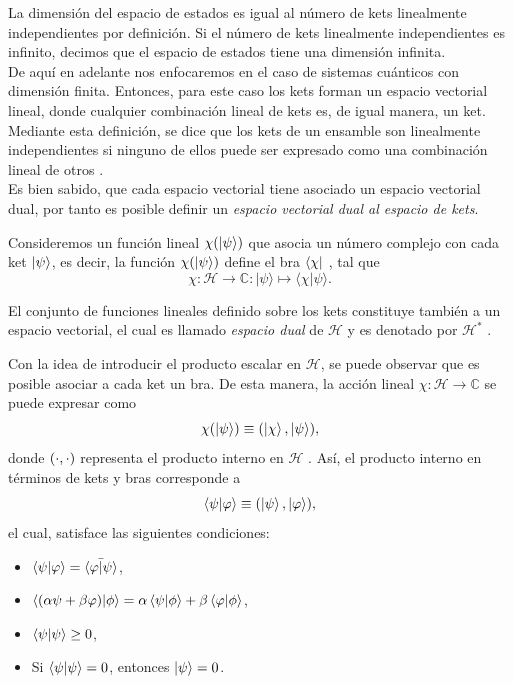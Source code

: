 \documentclass[../Main.tex]{subfiles}
\begin{document}
La dimensión del espacio de estados es igual al número de kets linealmente independientes por definición. Si el número de kets linealmente independientes es infinito, decimos que el espacio de estados tiene una dimensión infinita.\\
De aquí en adelante nos enfocaremos en el caso de sistemas cuánticos con dimensión finita. Entonces, para este caso los kets forman un espacio vectorial lineal, donde cualquier combinación lineal de kets es, de igual manera, un ket. 
Mediante esta definición, se dice que los kets de un ensamble son linealmente independientes si ninguno de ellos puede ser expresado como una combinación lineal de otros \cite{Messiah}.\\


Es bien sabido, que cada espacio vectorial tiene asociado un espacio vectorial dual, por tanto es posible definir un \emph{espacio vectorial dual al espacio de kets}.


Consideremos un función lineal $\chi(\ket{\psi})$ que asocia un número complejo con cada ket $\ket{\psi}$, es decir, la función $\chi(\ket{\psi})$ define el bra $\bra{\chi}$ \cite{Cohen}, tal que
\[
\chi: \mathcal{H} \to \mathbb{C}: | \psi \rangle \mapsto \langle \chi | \psi \rangle.
\]


El conjunto de funciones lineales definido sobre los kets constituye también a un espacio vectorial, el cual es llamado \emph{espacio dual} de $\mathcal{H}$ y es denotado por $\mathcal{H}^*$ \cite{Cohen}.
  

Con la idea de introducir el producto escalar en $\mathcal{H}$, se puede observar que es posible asociar a cada ket un bra. De esta manera, la acción lineal $\chi:\mathcal{H}\to \mathbb{C}$ se puede expresar como
\begin{equation}
\chi(\ket{\psi})\equiv\qty(\ket{\chi},\ket{\psi}),
\end{equation}
donde $\qty(\cdot,\cdot)$ representa el producto interno en $\mathcal{H}$ \cite{Cohen}. Así, el producto interno en términos de kets y bras \cite{Messiah} corresponde a
\begin{equation}
    \ip{\psi}{\varphi}\equiv\qty(\ket{\psi},\ket{\varphi}),
\end{equation}
el cual, satisface las siguientes condiciones:
\begin{itemize}
    \item $\ip{\psi}{\varphi}=\bar{\ip{\varphi}{\psi}}$,
    \item $\ip{(\alpha\psi+\beta\varphi)}{\phi}=\alpha\ip{\psi}{\phi}+\beta\ip{\varphi}{\phi}$,
    \item $\ip{\psi}\geq 0$,
    \item Si $\ip{\psi}=0$, entonces $\ket{\psi}=0$.
\end{itemize}
\end{document}
